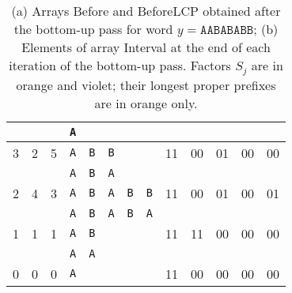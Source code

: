 \documentclass{llncs}
\newcommand{\Before}{\textsf{Before}}
\newcommand{\BeforeLCP}{\textsf{BeforeLCP}}
\newcommand{\Interval}{\textsf{Interval}}
\begin{document}
\begin{table}
\begin{center}
{{\begin{tabular}{|*{3}{c|}*{4}{c}*{6}{c|}}
 & & &\cellcolor{Thistle}\texttt{A}& & & & & & & & & \\ \hline
3&2&5&\cellcolor{Apricot}\texttt{A}&\cellcolor{Apricot}\texttt{B}&\cellcolor{Thistle}\texttt{B}& & &11&00&01&00&00\\ \hline
 & & &\cellcolor{Apricot}\texttt{A}&\cellcolor{Apricot}\texttt{B}&\cellcolor{Thistle}\texttt{A}& & & & & & & \\ \hline
2&4&3&\cellcolor{Apricot}\texttt{A}&\cellcolor{Apricot}\texttt{B}&\cellcolor{Apricot}\texttt{A}&\cellcolor{Apricot}\texttt{B}&\cellcolor{Thistle}\texttt{B}&11&00&01&00&01\\ \hline
 & & &\cellcolor{Apricot}\texttt{A}&\cellcolor{Apricot}\texttt{B}&\cellcolor{Apricot}\texttt{A}&\cellcolor{Apricot}\texttt{B}&\cellcolor{Thistle}\texttt{A}& & & & &\\ \hline
1&1&1&\cellcolor{Apricot}\texttt{A}&\cellcolor{Thistle}\texttt{B}& & & &11&11&00&00&00\\ \hline
 & & &\cellcolor{Apricot}\texttt{A}&\cellcolor{Thistle}\texttt{A}& & & & & & & &\\ \hline
0&0&0&\cellcolor{Thistle}\texttt{A}& & & & &11&00&00&00&00\\ \hline
\end{tabular}
}
}
  \end{center}
  \caption{(a) Arrays \Before{} and \BeforeLCP{} obtained after the bottom-up pass for word $y=\texttt{AABABABB}$; (b) Elements of array \Interval{} at the end of each iteration of the bottom-up pass. Factors $S_{j}$ are in orange and violet; their longest proper prefixes are in orange only.}
\label{tab:bu}
\end{table}
\end{document}

